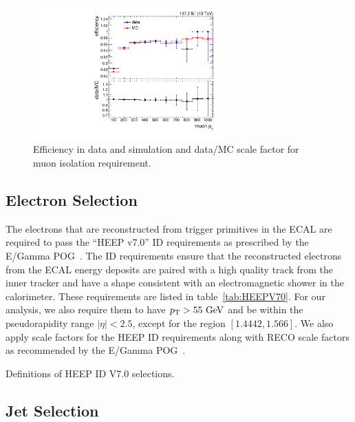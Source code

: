 \begin{figure}[htbp]
  \centering
  \includegraphics[width=0.65\textwidth]{fig/eventSelection/muonFullIsoSF.pdf}
  \caption{
    Efficiency in data and simulation and data/MC scale factor for muon isolation requirement.
  }
  \label{fig:muonIsoSF}
\end{figure}

\subsection{Electron Selection}
\label{subsec:elecSelect}

The electrons that are reconstructed from trigger primitives in the ECAL are required to pass the ``HEEP v7.0'' ID requirements as prescribed by the E/Gamma POG~\cite{HEEPV70}.
The ID requirements ensure that the reconstructed electrons from the ECAL energy deposits are paired with a high quality track from the inner tracker and have a shape consistent with an electromagnetic shower in the calorimeter.
These requirements are listed in table~\ref{tab:HEEPV70}.
For our analysis, we also require them to have $\pt>55\unit{GeV}$ and be within the pseudorapidity range $|\eta|<2.5$, except for the region $[1.4442,1.566]$. %
We also apply scale factors for the HEEP ID requirements along with RECO scale factors as recommended by the E/Gamma POG~\cite{EgammaScale}.

\begin{table}[htbp]
  \centering
  
  \caption{
    Definitions of HEEP ID V7.0 selections.
  }
  \label{tab:HEEPV70}
\end{table}

\subsection{Jet Selection}
\label{subsec:jetSelect}

